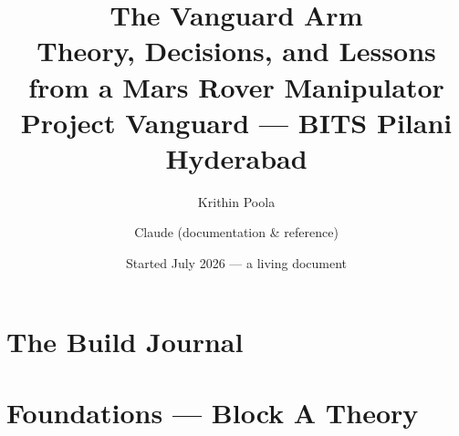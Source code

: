 \documentclass[11pt]{book}
\title{The Vanguard Arm\\
  \large Theory, Decisions, and Lessons from a Mars Rover Manipulator\\
  \normalsize Project Vanguard --- BITS Pilani Hyderabad}
\author{Krithin Poola \and Claude (documentation \& reference)}
\date{Started July 2026 --- a living document}
\theoremstyle{definition}
\begin{document}
\maketitle
\tableofcontents

\part{The Build Journal}










\part{Foundations --- Block A Theory}



\end{document}
